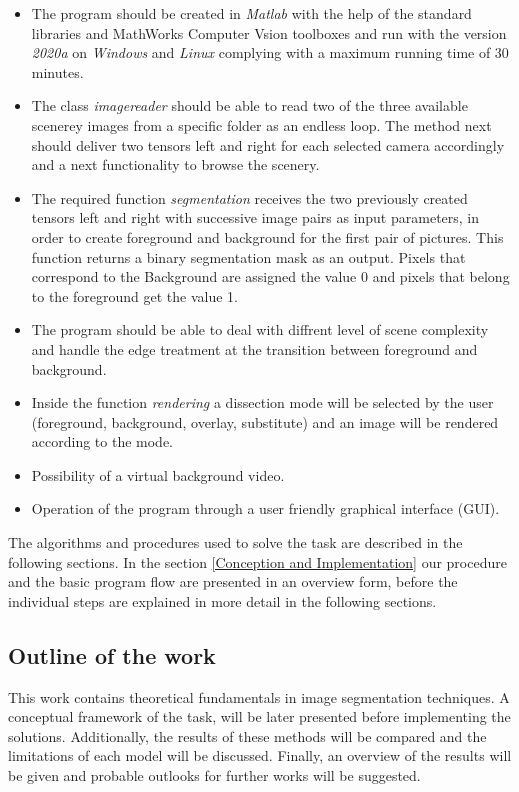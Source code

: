 \begin{itemize}

\item The program should be created in \textit{Matlab} with the help of the standard libraries and MathWorks Computer Vsion toolboxes and run with the version \textit{2020a} on \textit{Windows} and \textit{Linux} complying with a maximum running time of 30 minutes.

\item The class \textit{imagereader} should be able to read two of the three available scenerey images from a specific folder as an endless loop. The method next should deliver two tensors left and right for each selected camera accordingly and a next functionality to browse the scenery. 

\item The required function \textit{segmentation} receives the two previously created tensors left and right with successive
image pairs as input parameters, in order to create foreground and background for the first pair of pictures. This function returns a binary segmentation mask  as an output. Pixels that correspond to the
Background are assigned the value 0 and pixels that belong to the foreground get the value 1.

\item The program should be able to deal with diffrent level of scene complexity and handle the edge treatment at the transition between foreground and background.

\item Inside the function \textit{rendering} a dissection mode will be selected by the user (foreground, background, overlay, substitute) and an image will be rendered according to the mode. 

\item  Possibility of a virtual background video. 

\item Operation of the program through a user friendly graphical interface (GUI).

\end{itemize}

The algorithms and procedures used to solve the task are described in the following sections.
In the section \ref{Conception and Implementation} our procedure and the basic program flow are presented in an overview form, before the individual steps are explained in more detail in the following sections.

\subsection{Outline of the work}

This work contains theoretical fundamentals in image segmentation techniques. 
A conceptual framework of the task, will be later presented before implementing the solutions.
Additionally, the results of these methods will be compared and the limitations of each model will be discussed.
Finally, an overview of the results will be given and probable outlooks for further works will be suggested.

